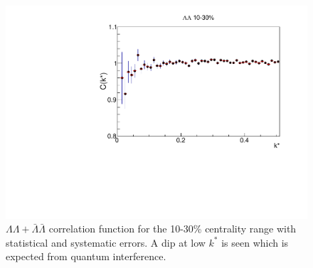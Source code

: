 \begin{figure}[hbt]
\includegraphics[width=36pc]{Figures/CFs/2016-8-30-CFLLAA1030CombinedSystematicsMaximum.pdf}
\caption[$\Lambda\Lambda + \bar{\Lambda}\bar{\Lambda}$ correlation function for the 10-30\% centrality range]{$\Lambda\Lambda + \bar{\Lambda}\bar{\Lambda}$ correlation function for the 10-30\% centrality range with statistical and systematic errors.  
A dip at low $k^*$ is seen which is expected from quantum interference.}
\label{fig:CFLamLamALamALam1030STAR}
\end{figure}


